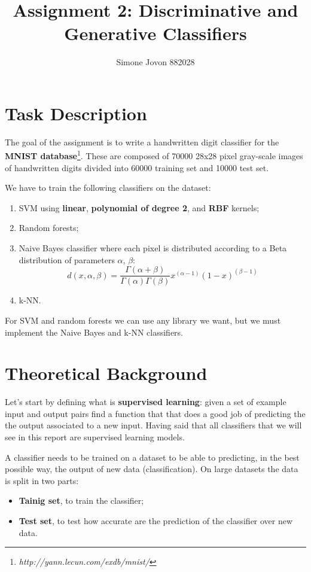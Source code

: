\documentclass[12pt]{article}
\author{Simone Jovon 882028}
\title{Assignment 2: Discriminative and Generative Classifiers}
\begin{document}
\maketitle

\section{Task Description}

The goal of the assignment is to write a handwritten digit classifier for the 
\textbf{MNIST database}\footnote{\textit{http://yann.lecun.com/exdb/mnist/}}. 
These are composed of 70000 28x28 pixel gray-scale images 
of handwritten digits divided into 60000 training set and 10000 test set.

We have to train the following classifiers on the dataset:
\begin{enumerate}
    \item SVM  using \textbf{linear}, \textbf{polynomial of degree 2}, 
            and \textbf{RBF} kernels;
    \item Random forests;
    \item Naive Bayes classifier where each pixel is distributed according to a Beta 
          distribution of parameters $\alpha$, $\beta$:
          $$
          d(x,\alpha,\beta)=\frac{\Gamma(\alpha+\beta)}{\Gamma(\alpha)\Gamma(\beta)} x^{(\alpha-1)} (1-x)^{(\beta-1)}
          $$
    \item k-NN.
\end{enumerate}

For SVM and random forests we can use any library we want, but we must implement 
the Naive Bayes and k-NN classifiers.

\section{Theoretical Background}

Let's start by defining what is \textbf{supervised learning}: given a set of example
input and output  pairs find a function that that does a good job of predicting the
the output associated to a new input. 
Having said that all classifiers that we will see in this report are supervised 
learning models.

A classifier needs to be trained on a dataset to be able to predicting, in the best
possible way, the output of new data (classification). 
On large datasets the data is split in two parts:
\begin{itemize}
    \item \textbf{Tainig set}, to train the classifier;
    \item \textbf{Test set}, to test how accurate are the prediction of the classifier
            over new data.
\end{itemize}
\end{document}

